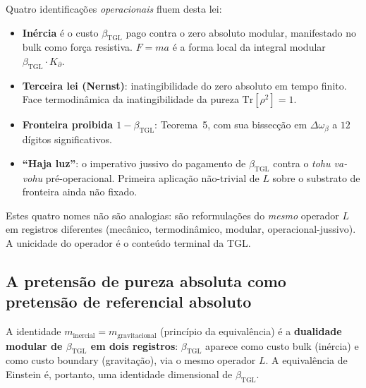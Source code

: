 \documentclass[12pt,a4paper]{article}
\newcommand{\betatgl}{\beta_{\text{TGL}}}
\newcommand{\Kpartial}{K_{\partial}}
\newcommand{\TGL}{\textsc{TGL}}
\begin{document}
Quatro identificações \emph{operacionais} fluem desta lei:
\begin{itemize}[leftmargin=*]
\item \textbf{Inércia} é o custo $\betatgl$ pago contra o zero absoluto
modular, manifestado no bulk como força resistiva.  $F = ma$ é a forma
local da integral modular $\betatgl \cdot \Kpartial$.
\item \textbf{Terceira lei (Nernst)}: inatingibilidade do zero absoluto
em tempo finito.  Face termodinâmica da inatingibilidade da pureza
$\mathrm{Tr}[\rho^{2}] = 1$.
\item \textbf{Fronteira proibida $1 - \betatgl$}: Teorema~5, com sua
bissecção em $\Delta\omega_{\beta}$ a $12$ dígitos significativos.
\item \textbf{``Haja luz''}: o imperativo jussivo do pagamento de
$\betatgl$ contra o \emph{tohu va-vohu} pré-operacional.  Primeira
aplicação não-trivial de $L$ sobre o substrato de fronteira ainda não
fixado.
\end{itemize}
Estes quatro nomes não são analogias: são reformulações do \emph{mesmo}
operador $L$ em registros diferentes (mecânico, termodinâmico, modular,
operacional-jussivo).  A unicidade do operador é o conteúdo terminal
da \TGL{}.

\subsection{A pretensão de pureza absoluta como pretensão de referencial absoluto}
\label{subsec:pureza}

A identidade $m_{\text{inercial}} = m_{\text{gravitacional}}$ (princípio
da equivalência) é a \textbf{dualidade modular de $\betatgl$ em dois
registros}: $\betatgl$ aparece como custo bulk (inércia) e como custo
boundary (gravitação), via o mesmo operador $L$.  A equivalência de
Einstein é, portanto, uma identidade dimensional de $\betatgl$.
\end{document}
